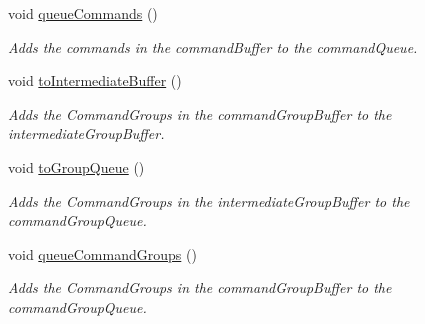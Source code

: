 \begin{DoxyCompactItemize}
\mbox{\label{classlib_iterative_robot_1_1_event_scheduler_a0334c1b83511053b6da8583caf6b87be}} 
void \mbox{\hyperlink{classlib_iterative_robot_1_1_event_scheduler_a0334c1b83511053b6da8583caf6b87be}{queue\+Commands}} ()
\begin{DoxyCompactList}\small\item\em Adds the commands in the command\+Buffer to the command\+Queue. \end{DoxyCompactList}\item 
\mbox{\label{classlib_iterative_robot_1_1_event_scheduler_a1b5e99e2665ef24bc985b07bff42a1f6}} 
void \mbox{\hyperlink{classlib_iterative_robot_1_1_event_scheduler_a1b5e99e2665ef24bc985b07bff42a1f6}{to\+Intermediate\+Buffer}} ()
\begin{DoxyCompactList}\small\item\em Adds the Command\+Groups in the command\+Group\+Buffer to the intermediate\+Group\+Buffer. \end{DoxyCompactList}\item 
\mbox{\label{classlib_iterative_robot_1_1_event_scheduler_a5ee3b365b5168aef74afd878e7a82ba1}} 
void \mbox{\hyperlink{classlib_iterative_robot_1_1_event_scheduler_a5ee3b365b5168aef74afd878e7a82ba1}{to\+Group\+Queue}} ()
\begin{DoxyCompactList}\small\item\em Adds the Command\+Groups in the intermediate\+Group\+Buffer to the command\+Group\+Queue. \end{DoxyCompactList}\item 
\mbox{\label{classlib_iterative_robot_1_1_event_scheduler_a4df12d213a4ea996c942fdf1b85033b1}} 
void \mbox{\hyperlink{classlib_iterative_robot_1_1_event_scheduler_a4df12d213a4ea996c942fdf1b85033b1}{queue\+Command\+Groups}} ()
\begin{DoxyCompactList}\small\item\em Adds the Command\+Groups in the command\+Group\+Buffer to the command\+Group\+Queue. \end{DoxyCompactList}\item 
\mbox{\label{classlib_iterative_robot_1_1_event_scheduler_af5c6b0f9d31490e9ede73efe4858373a}} 

\end{DoxyCompactItemize}
